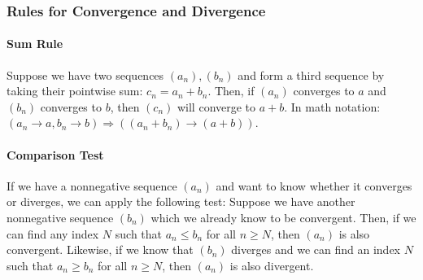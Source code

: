 








\subsubsection{Rules for Convergence and Divergence} 

\paragraph{Sum Rule}
Suppose we have two sequences $(a_n), (b_n)$ and form a third sequence by taking their pointwise sum: $c_n = a_n + b_n$. Then, if $(a_n)$ converges to $a$ and $(b_n)$ converges to $b$, then $(c_n)$ will converge to $a+b$. In math notation: $(a_n \rightarrow a, b_n \rightarrow b) \Rightarrow ((a_n + b_n) \rightarrow (a + b))$.

\paragraph{Comparison Test}
If we have a nonnegative sequence $(a_n)$ and want to know whether it converges or diverges, we can apply the following test: Suppose we have another nonnegative sequence $(b_n)$ which we already know to be convergent. Then, if we can find any index $N$ such that $a_n \leq b_n$ for all $n \geq N$, then $(a_n)$ is also convergent. Likewise, if we know that $(b_n)$ diverges and we can find an index $N$ such that $a_n \geq b_n$ for all $n \geq N$, then $(a_n)$ is also divergent.

